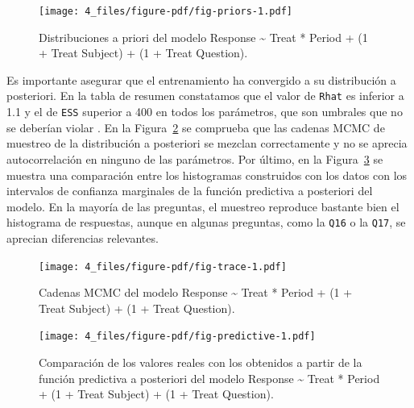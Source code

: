 \documentclass[
  12pt,
  a4paper,
  extrafontsizes,
  onecolumn,
  openright,
  table]{memoir}
\begin{document}
\normalsize

\begin{figure}[h]

{\centering \texttt{[image: 4\_files/figure-pdf/fig-priors-1.pdf]}

}

\caption{\label{fig-priors}Distribuciones a priori del modelo Response
\textasciitilde{} Treat * Period + (1 + Treat \textbar{} Subject) + (1 +
Treat \textbar{} Question).}

\end{figure}

Es importante asegurar que el entrenamiento ha convergido a su
distribución a posteriori. En la tabla de resumen constatamos que el
valor de \texttt{Rhat} es inferior a 1.1 y el de \texttt{ESS} superior a
400 en todos los parámetros, que son umbrales que no se deberían violar
\autocite[ver][]{burkner2019}. En la Figura~\ref{fig-trace} se comprueba
que las cadenas MCMC de muestreo de la distribución a posteriori se
mezclan correctamente y no se aprecia autocorrelación en ninguno de las
parámetros. Por último, en la Figura~\ref{fig-predictive} se muestra una
comparación entre los histogramas construidos con los datos con los
intervalos de confianza marginales de la función predictiva a posteriori
del modelo. En la mayoría de las preguntas, el muestreo reproduce
bastante bien el histograma de respuestas, aunque en algunas preguntas,
como la \texttt{Q16} o la \texttt{Q17}, se aprecian diferencias
relevantes.

\begin{figure}[h]

{\centering \texttt{[image: 4\_files/figure-pdf/fig-trace-1.pdf]}

}

\caption{\label{fig-trace}Cadenas MCMC del modelo Response
\textasciitilde{} Treat * Period + (1 + Treat \textbar{} Subject) + (1 +
Treat \textbar{} Question).}

\end{figure}

\begin{figure}[h]

{\centering \texttt{[image: 4\_files/figure-pdf/fig-predictive-1.pdf]}

}

\caption{\label{fig-predictive}Comparación de los valores reales con los
obtenidos a partir de la función predictiva a posteriori del modelo
Response \textasciitilde{} Treat * Period + (1 + Treat \textbar{}
Subject) + (1 + Treat \textbar{} Question).}

\end{figure}
\end{document}
